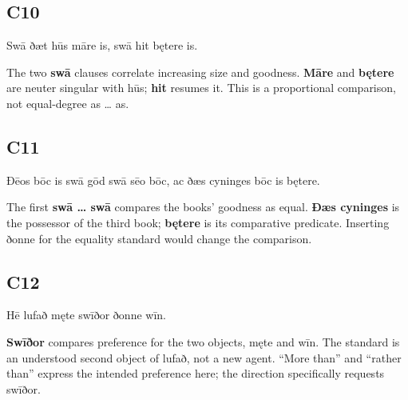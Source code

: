 \subsection*{C10}

\par\begin{minipage}{\linewidth}\raggedright
Swā ðæt hūs māre is, swā hit bętere is.

The two \textbf{swā} clauses correlate increasing size and goodness. \textbf{Māre} and \textbf{bętere} are neuter singular with hūs; \textbf{hit} resumes it. This is a proportional comparison, not equal-degree as … as.

\end{minipage}\par\addvspace{4pt}

\subsection*{C11}

\par\begin{minipage}{\linewidth}\raggedright
Ðēos bōc is swā gōd swā sēo bōc, ac ðæs cyninges bōc is bętere.

The first \textbf{swā … swā} compares the books’ goodness as equal. \textbf{Ðæs cyninges} is the possessor of the third book; \textbf{bętere} is its comparative predicate. Inserting ðonne for the equality standard would change the comparison.

\end{minipage}\par\addvspace{4pt}

\subsection*{C12}

\par\begin{minipage}{\linewidth}\raggedright
Hē lufað męte swīðor ðonne wīn.

\textbf{Swīðor} compares preference for the two objects, męte and wīn. The standard is an understood second object of lufað, not a new agent. “More than” and “rather than” express the intended preference here; the direction specifically requests swīðor.

\end{minipage}\par\addvspace{4pt}

